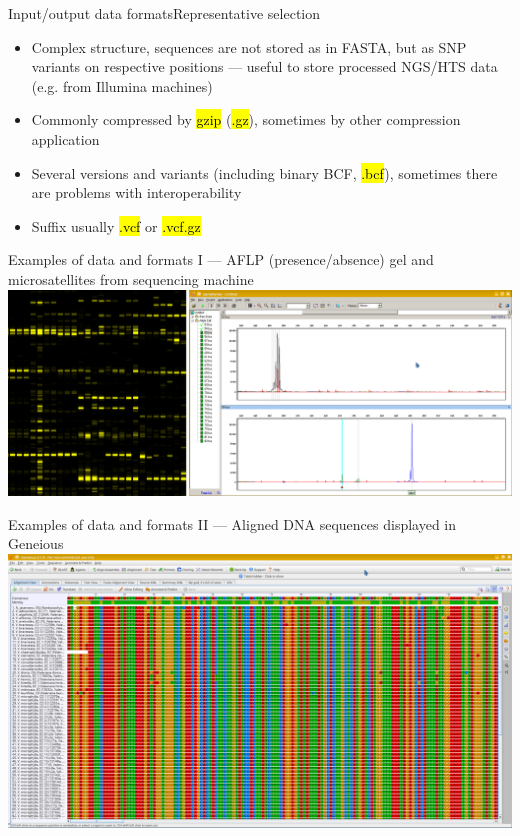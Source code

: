 \documentclass[compress, ucs, xelatex, 11pt, xcolor=svgnames,
  hyperref={
    bookmarks=true,
    unicode=true,
    colorlinks=true,
    pdftitle={Molecular data in R},
    plainpages=false,
    pdfauthor={Vojtech Zeisek},
    pdfsubject={Course about phylogeny and evolution in R},
    pdfcreator={XeLaTeX},
    pdfkeywords={R, evolution, phylogeny, molecular data},
    linkcolor=Tomato,
    anchorcolor=SaddleBrown,
    citecolor=Goldenrod,
    filecolor=DarkMagenta,
    menucolor=Sienna,
    urlcolor=DarkTurquoise,
    pdftex},
  url={hyphens, lowtilde} %
  ]{beamer}
\renewcommand{\texttt}[1]{\hl{\ttfamily #1}}
\begin{document}
\begin{frame}[allowframebreaks]{Input/output data formats}{Representative selection}
\begin{itemize}
\begin{itemize}
      \item Complex structure, sequences are not stored as in FASTA, but as SNP variants on respective positions --- useful to store processed NGS/HTS data (e.g. from Illumina machines)
      \item Commonly compressed by \texttt{gzip} (\texttt{*.gz}), sometimes by other compression application
      \item Several versions and variants (including binary BCF, \texttt{*.bcf}), sometimes there are problems with interoperability
      \item Suffix usually \texttt{*.vcf} or \texttt{*.vcf.gz}
    \end{itemize}
  \end{itemize}
\end{frame}

\begin{frame}{Examples of data and formats I --- AFLP (presence/absence) gel and microsatellites from sequencing machine}
  \includegraphics[width=\textwidth]{aflp_ssrs.png}
\end{frame}

\begin{frame}{Examples of data and formats II --- Aligned DNA sequences displayed in Geneious}
  \includegraphics[width=\textwidth]{alignment_geneious.png}
\end{frame}
\end{document}
